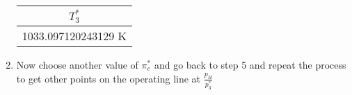 \documentclass[titlepage]{article}
\begin{document}
\begin{enumerate}
  \begin{center}
    \begin{tabular}{|c|}
      \hline
      $T_{3}^{*}$ \\
      \hline
      1033.097120243129 K \\
      \hline
    \end{tabular}
  \end{center}

\item Now choose another value of $\pi_{c}^{*}$ and go back to step 5 and repeat the process to get other points on the operating line at $\frac{p_{H}}{p_{3}^{*}}$ 


\end{enumerate}
\end{document}
